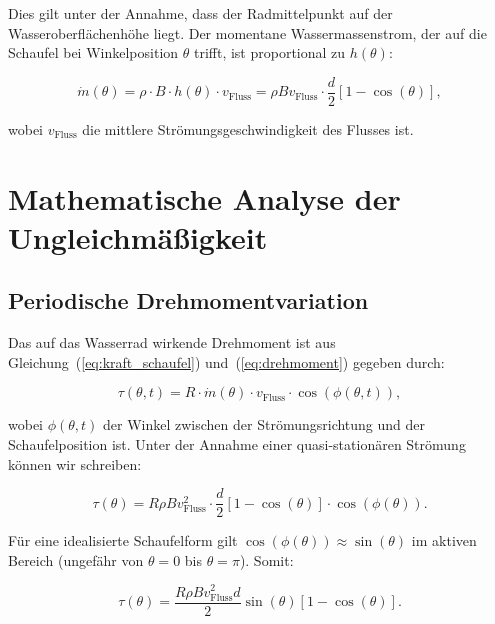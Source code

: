 \documentclass[a4paper,12pt]{article}
\theoremstyle{definition}
\begin{document}
Dies gilt unter der Annahme, dass der Radmittelpunkt auf der Wasseroberflächenhöhe liegt. Der momentane Wassermassenstrom, der auf die Schaufel bei Winkelposition $\theta$ trifft, ist proportional zu $h(\theta)$:

\begin{equation}
  \dot{m}(\theta) = \rho \cdot B \cdot h(\theta) \cdot v_\text{Fluss} = \rho B v_\text{Fluss} \cdot \frac{d}{2}[1 - \cos(\theta)],
  \label{eq:massenstrom_theta}
\end{equation}

\noindent
wobei $v_\text{Fluss}$ die mittlere Strömungsgeschwindigkeit des Flusses ist.

\section{Mathematische Analyse der Ungleichmäßigkeit}

\subsection{Periodische Drehmomentvariation}

Das auf das Wasserrad wirkende Drehmoment ist aus Gleichung~(\ref{eq:kraft_schaufel}) und~(\ref{eq:drehmoment}) gegeben durch:

\begin{equation}
  \tau(\theta,t) = R \cdot \dot{m}(\theta) \cdot v_\text{Fluss} \cdot \cos(\phi(\theta,t)),
  \label{eq:tau_theta}
\end{equation}

\noindent
wobei $\phi(\theta,t)$ der Winkel zwischen der Strömungsrichtung und der Schaufelposition ist. Unter der Annahme einer quasi-stationären Strömung können wir schreiben:

\begin{equation}
  \tau(\theta) = R \rho B v_\text{Fluss}^2 \cdot \frac{d}{2}[1 - \cos(\theta)] \cdot \cos(\phi(\theta)).
  \label{eq:tau_quasi_stationaer}
\end{equation}

Für eine idealisierte Schaufelform gilt $\cos(\phi(\theta)) \approx \sin(\theta)$ im aktiven Bereich (ungefähr von $\theta = 0$ bis $\theta = \pi$). Somit:

\begin{equation}
  \tau(\theta) = \frac{R \rho B v_\text{Fluss}^2 d}{2} \sin(\theta) [1 - \cos(\theta)].
  \label{eq:tau_ideal}
\end{equation}
\end{document}
